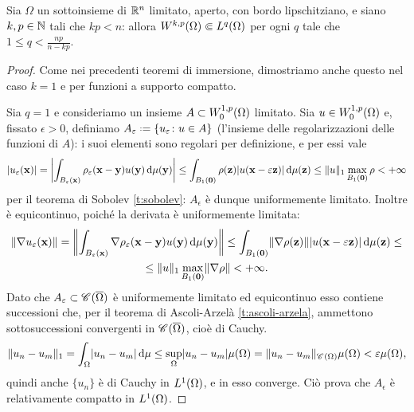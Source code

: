\begin{teorema} \label{t:rellich-kondrachov}
    Sia $\Omega$ un sottoinsieme di $\R^n$ limitato, aperto, con bordo lipschitziano, e siano $k,p\in\N$ tali che $kp<n$: allora $\sobW[k,p]{\Omega}\cemb\leb[q]{\Omega}$ per ogni $q$ tale che $1\le q<\frac{np}{n-kp}$.
\end{teorema}
\begin{proof}
    Come nei precedenti teoremi di immersione, dimostriamo anche questo nel caso $k=1$ e per funzioni a supporto compatto.

    Sia $q=1$ e consideriamo un insieme $A\subset\sobWc[1,p]{\Omega}$ limitato.
    Sia $u\in\sobWc[1,p]{\Omega}$ e, fissato $\epsilon>0$, definiamo $A_\epsilon\defeq\{u_\epsilon\colon u\in A\}$ (l'insieme delle regolarizzazioni delle funzioni di $A$): i suoi elementi sono regolari per definizione, e per essi vale
    \begin{equation}
        \abs{u_\epsilon(\vec x)}=
        \abs[\bigg]{\int_{B_\epsilon(\vec x)} \rho_\epsilon(\vec x-\vec y)u(\vec y)\,\dd\mu(\vec y)}\le
        \int_{B_1(\vec 0)} \rho(\vec z)\abs{u(\vec x-\epsilon\vec z)}\,\dd\mu(\vec z)\le
        \norm{u}_1\max_{B_1(\vec 0)}\rho<
        +\infty
    \end{equation}
    per il teorema di Sobolev \ref{t:sobolev}: $A_\epsilon$ è dunque uniformemente limitato.
    Inoltre è equicontinuo, poich\'e la derivata è uniformemente limitata:
    \begin{multline}
        \norm{\grad u_\epsilon(\vec x)}=
        \norm[\bigg]{\int_{B_\epsilon(\vec x)}\grad\rho_\epsilon(\vec x-\vec y)u(\vec y)\,\dd\mu(\vec y)}\le
        \int_{B_1(\vec 0)}\norm{\grad\rho(\vec z)}\abs{u(\vec x-\epsilon\vec z)}\,\dd\mu(\vec z)\le\\ \le
        \norm{u}_1\max_{B_1(\vec 0)}\norm{\grad\rho}<
        +\infty.
    \end{multline}
    Dato che $A_\epsilon\subset\cont{\clos{\Omega}}$ è uniformemente limitato ed equicontinuo esso contiene successioni che, per il teorema di Ascoli-Arzelà \ref{t:ascoli-arzela}, ammettono sottosuccessioni convergenti in $\cont{\clos{\Omega}}$, cioè di Cauchy.
    \begin{equation}
        \norm{u_n-u_m}_1=
        \int_\Omega\abs{u_n-u_m}\,\dd\mu\le
        \sup_\Omega\abs{u_n-u_m}\mu(\Omega)=
        \norm{u_n-u_m}_{\cont{\Omega}}\mu(\Omega)<
        \epsilon\mu(\Omega),
    \end{equation}
    quindi anche $\{u_n\}$ è di Cauchy in $\leb[1]{\Omega}$, e in esso converge.
    Ciò prova che $A_\epsilon$ è relativamente compatto in $\leb[1]{\Omega}$.


\end{proof}
